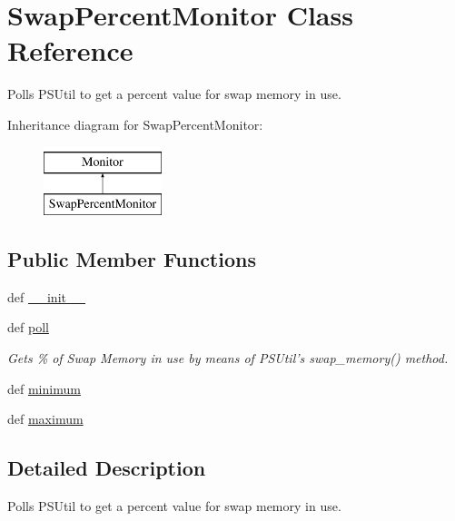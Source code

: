 \hypertarget{classsrc_1_1client_1_1_swap_percent_monitor_1_1_swap_percent_monitor}{\section{Swap\-Percent\-Monitor Class Reference}
\label{classsrc_1_1client_1_1_swap_percent_monitor_1_1_swap_percent_monitor}
}


Polls P\-S\-Util to get a percent value for swap memory in use.  


Inheritance diagram for Swap\-Percent\-Monitor\-:\begin{figure}[H]
\begin{center}
\leavevmode
\includegraphics[height=2.000000cm]{classsrc_1_1client_1_1_swap_percent_monitor_1_1_swap_percent_monitor}
\end{center}
\end{figure}
\subsection*{Public Member Functions}
\begin{DoxyCompactItemize}
\item 
def \hyperlink{classsrc_1_1client_1_1_swap_percent_monitor_1_1_swap_percent_monitor_ac775ee34451fdfa742b318538164070e}{\-\_\-\-\_\-init\-\_\-\-\_\-}
\item 
def \hyperlink{classsrc_1_1client_1_1_swap_percent_monitor_1_1_swap_percent_monitor_a87cd0076a6d482a01482f25a64cf2fb4}{poll}
\begin{DoxyCompactList}\small\item\em Gets \% of Swap Memory in use by means of P\-S\-Util's swap\-\_\-memory() method. \end{DoxyCompactList}\item 
def \hyperlink{classsrc_1_1client_1_1_swap_percent_monitor_1_1_swap_percent_monitor_a4515aa6e0be4391413959391fef1109f}{minimum}
\item 
def \hyperlink{classsrc_1_1client_1_1_swap_percent_monitor_1_1_swap_percent_monitor_a8f6589fdc9d322ec8e0dc2c7ede55ce9}{maximum}
\end{DoxyCompactItemize}


\subsection{Detailed Description}
Polls P\-S\-Util to get a percent value for swap memory in use. 


